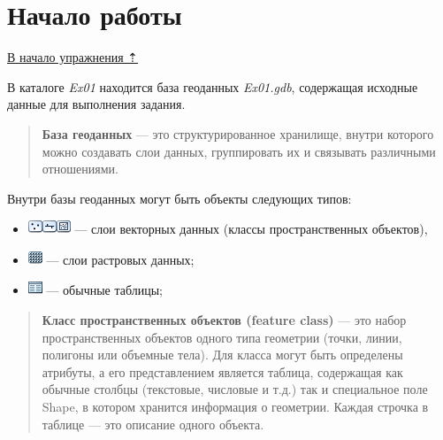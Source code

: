 \documentclass[]{book}
\providecommand{\tightlist}{%
  \setlength{\itemsep}{0pt}\setlength{\parskip}{0pt}}
\theoremstyle{definition}
\theoremstyle{definition}
\theoremstyle{definition}
\theoremstyle{remark}
\begin{document}
\hypertarget{map-design-climates-begin}{%
\section{Начало работы}\label{map-design-climates-begin}}

\protect\hyperlink{map-design-climates}{В начало упражнения ⇡}

В каталоге \emph{Ex01} находится база геоданных \emph{Ex01.gdb},
содержащая исходные данные для выполнения задания.

\begin{quote}
\textbf{База геоданных} --- это структурированное хранилище, внутри
которого можно создавать слои данных, группировать их и связывать
различными отношениями.
\end{quote}

Внутри базы геоданных могут быть объекты следующих типов:

\begin{itemize}
\tightlist
\item
  \includegraphics{images/Ex01/image7.png}\includegraphics{images/Ex01/image8.png}\includegraphics{images/Ex01/image9.png}
  --- слои векторных данных (классы пространственных объектов),
\item
  \includegraphics{images/Ex01/image10.png} --- слои растровых данных;
\item
  \includegraphics{images/Ex01/image11.png} --- обычные таблицы;
\end{itemize}

\begin{quote}
\textbf{Класс пространственных объектов (feature class)} --- это набор
пространственных объектов одного типа геометрии (точки, линии, полигоны
или объемные тела). Для класса могут быть определены атрибуты, а его
представлением является таблица, содержащая как обычные столбцы
(текстовые, числовые и т.д.) так и специальное поле Shape, в котором
хранится информация о геометрии. Каждая строчка в таблице --- это
описание одного объекта.
\end{quote}
\end{document}
